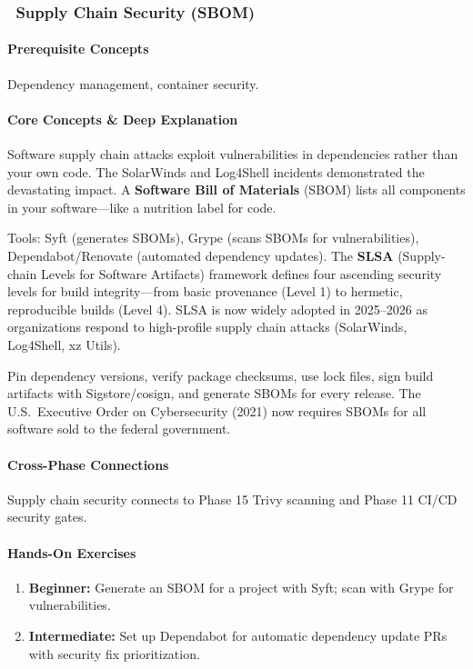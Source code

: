 \documentclass[11pt, a4paper, oneside]{report}
\newcommand{\awareness}[1]{\subsubsection{\texorpdfstring{\fcolorbox{gray!50}{gray!10}{\footnotesize\bfseries\color{gray!50!black} AWARENESS}~#1}{#1}}}
\begin{document}
\awareness{Supply Chain Security (SBOM)}

\paragraph{Prerequisite Concepts} Dependency management, container security.

\paragraph{Core Concepts \& Deep Explanation} Software supply chain attacks exploit vulnerabilities in dependencies rather than your own code. The SolarWinds and Log4Shell incidents demonstrated the devastating impact. A \textbf{Software Bill of Materials} (SBOM) lists all components in your software---like a nutrition label for code.

Tools: Syft (generates SBOMs), Grype (scans SBOMs for vulnerabilities), Dependabot/Renovate (automated dependency updates). The \textbf{SLSA} (Supply-chain Levels for Software Artifacts) framework defines four ascending security levels for build integrity---from basic provenance (Level 1) to hermetic, reproducible builds (Level 4). SLSA is now widely adopted in 2025--2026 as organizations respond to high-profile supply chain attacks (SolarWinds, Log4Shell, xz Utils).

Pin dependency versions, verify package checksums, use lock files, sign build artifacts with Sigstore/cosign, and generate SBOMs for every release. The U.S.\ Executive Order on Cybersecurity (2021) now requires SBOMs for all software sold to the federal government.

\paragraph{Cross-Phase Connections} Supply chain security connects to Phase 15 Trivy scanning and Phase 11 CI/CD security gates.

\paragraph{Hands-On Exercises}
\begin{enumerate}[leftmargin=*]
\item \textbf{Beginner:} Generate an SBOM for a project with Syft; scan with Grype for vulnerabilities.
\item \textbf{Intermediate:} Set up Dependabot for automatic dependency update PRs with security fix prioritization.
\end{enumerate}
\end{document}
